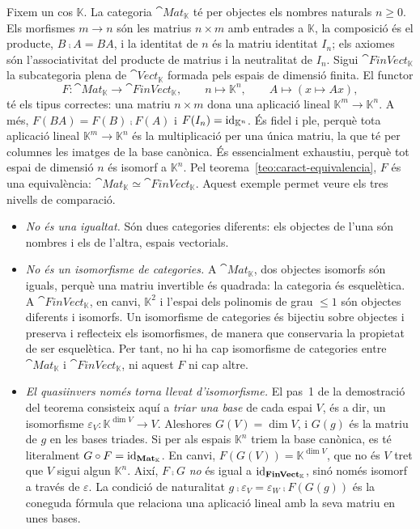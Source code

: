 \begin{exemple}\label{ex:mat-finvect}
Fixem un cos $\mathbb K$. La categoria $\cat{Mat}_{\mathbb K}$ té per objectes els nombres naturals $n\geq 0$. Els morfismes $m\to n$ són les matrius $n\times m$ amb entrades a $\mathbb K$, la composició és el producte, $B\comp A=BA$, i la identitat de $n$ és la matriu identitat $I_n$; els axiomes són l'associativitat del producte de matrius i la neutralitat de $I_n$. Sigui $\cat{FinVect}_{\mathbb K}$ la subcategoria plena de $\cat{Vect}_{\mathbb K}$ formada pels espais de dimensió finita. El functor
\[
F\colon\cat{Mat}_{\mathbb K}\to\cat{FinVect}_{\mathbb K},\qquad n\mapsto\mathbb K^n,\qquad A\mapsto(x\mapsto Ax),
\]
té els tipus correctes: una matriu $n\times m$ dona una aplicació lineal $\mathbb K^m\to\mathbb K^n$. A més, $F(BA)=F(B)\comp F(A)$ i $F(I_n)=\operatorname{id}_{\mathbb K^n}$. És fidel i ple, perquè tota aplicació lineal $\mathbb K^m\to\mathbb K^n$ és la multiplicació per una única matriu, la que té per columnes les imatges de la base canònica. És essencialment exhaustiu, perquè tot espai de dimensió $n$ és isomorf a $\mathbb K^n$. Pel teorema~\ref{teo:caract-equivalencia}, $F$ és una equivalència: $\cat{Mat}_{\mathbb K}\simeq\cat{FinVect}_{\mathbb K}$. Aquest exemple permet veure els tres nivells de comparació.
\begin{itemize}
\item \emph{No és una igualtat.} Són dues categories diferents: els objectes de l'una són nombres i els de l'altra, espais vectorials.
\item \emph{No és un isomorfisme de categories.} A $\cat{Mat}_{\mathbb K}$, dos objectes isomorfs són iguals, perquè una matriu invertible és quadrada: la categoria és esquelètica. A $\cat{FinVect}_{\mathbb K}$, en canvi, $\mathbb K^2$ i l'espai dels polinomis de grau $\leq 1$ són objectes diferents i isomorfs. Un isomorfisme de categories és bijectiu sobre objectes i preserva i reflecteix els isomorfismes, de manera que conservaria la propietat de ser esquelètica. Per tant, no hi ha cap isomorfisme de categories entre $\cat{Mat}_{\mathbb K}$ i $\cat{FinVect}_{\mathbb K}$, ni aquest $F$ ni cap altre.
\item \emph{El quasiinvers només torna llevat d'isomorfisme.} El pas~1 de la demostració del teorema consisteix aquí a \emph{triar una base} de cada espai $V$, és a dir, un isomorfisme $\varepsilon_V\colon\mathbb K^{\dim V}\to V$. Aleshores $G(V)=\dim V$, i $G(g)$ és la matriu de $g$ en les bases triades. Si per als espais $\mathbb K^n$ triem la base canònica, es té literalment $G\circ F=\operatorname{id}_{\mathbf{Mat}_{\mathbb K}}$. En canvi, $F(G(V))=\mathbb K^{\dim V}$, que no és $V$ tret que $V$ sigui algun $\mathbb K^n$. Així, $F\comp G$ \emph{no} és igual a $\operatorname{id}_{\mathbf{FinVect}_{\mathbb K}}$, sinó només isomorf a través de $\varepsilon$. La condició de naturalitat $g\comp\varepsilon_V=\varepsilon_W\comp F(G(g))$ és la coneguda fórmula que relaciona una aplicació lineal amb la seva matriu en unes bases.

\end{itemize}
\end{exemple}
